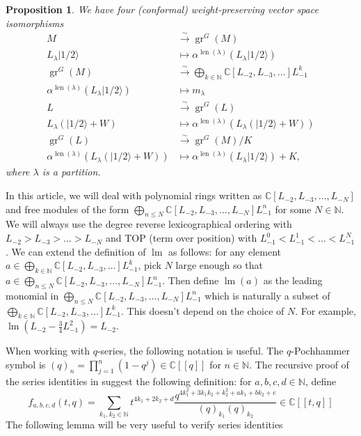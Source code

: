 \documentclass[12pt, a4paper]{article}
\newtheorem{proposition}[theorem]{Proposition}
\theoremstyle{remark}
\DeclareMathOperator{\gr}{gr}
\DeclareMathOperator{\lm}{lm}
\DeclareMathOperator{\len}{len}
\newcommand{\vachalf}{|1/2\rangle}
\begin{document}
\begin{proposition}
  \label{prp:8}
  We have four (conformal) weight-preserving vector space isomorphisms
  \begin{align*}
    M &\xrightarrow{\sim} \gr^G(M) \\
    L_\lambda\vachalf &\mapsto \alpha^{\len(\lambda)}(L_\lambda\vachalf) \\
    \gr^G(M) &\xrightarrow{\sim} \bigoplus_{k \in \mathbb{N}}\mathbb{C}[L_{-2}, L_{-3}, \dots]L_{-1}^k \\
    \alpha^{\len(\lambda)}(L_\lambda\vachalf) &\mapsto m_\lambda \\
    L &\xrightarrow{\sim} \gr^G(L) \\
    L_\lambda(\vachalf + W) &\mapsto \alpha^{\len(\lambda)}(L_\lambda(\vachalf + W)) \\
    \gr^G(L) &\xrightarrow{\sim} \gr^G(M)/K \\
    \alpha^{\len(\lambda)}(L_\lambda(\vachalf + W)) &\mapsto \alpha^{\len(\lambda)}(L_\lambda\vachalf) + K,
  \end{align*}
  where $\lambda$ is a partition.
\end{proposition}

In this article, we will deal with polynomial rings written as $\mathbb{C}[L_{-2}, L_{-3}, \dots, L_{-N}]$ and free modules of the form $\bigoplus_{n \le N}\mathbb{C}[L_{-2}, L_{-3}, \dots, L_{-N}]L_{-1}^n$ for some $N \in \mathbb{N}$.
We will always use the degree reverse lexicographical ordering with $L_{-2} > L_{-3} > \dots > L_{-N}$ and TOP (term over position) with $L_{-1}^0 < L_{-1}^1 < \dots < L_{-1}^N$.
We can extend the definition of $\lm$ as follows: for any element $a \in \bigoplus_{k \in \mathbb{N}}\mathbb{C}[L_{-2}, L_{-3}, \dots]L_{-1}^k$, pick $N$ large enough so that $a \in \bigoplus_{n \le N}\mathbb{C}[L_{-2}, L_{-3}, \dots, L_{-N}]L_{-1}^n$.
Then define $\lm(a)$ as the leading monomial in $\bigoplus_{n \le N}\mathbb{C}[L_{-2}, L_{-3}, \dots, L_{-N}]L_{-1}^n$ which is naturally a subset of $\bigoplus_{k \in \mathbb{N}}\mathbb{C}[L_{-2}, L_{-3}, \dots]L_{-1}^k$.
This doesn't depend on the choice of $N$.
For example, $\lm(L_{-2} - \frac{3}{4}L_{-1}^2) = L_{-2}$.

When working with $q$-series, the following notation is useful.
The $q$-Pochhammer symbol is $(q)_n = \prod_{j = 1}^n(1 - q^j) \in \mathbb{C}[[q]]$ for $n \in \mathbb{N}$.
The recursive proof of the series identities in \cite{andrews_singular_2022} suggest the following definition: for $a, b, c, d \in \mathbb{N}$, define
\begin{equation*}
  f_{a, b, c, d}(t, q) = \sum_{k_1, k_2 \in \mathbb{N}}t^{4k_1 + 2k_2 + d}\frac{q^{4k_1^2 + 3k_1k_2 + k_2^2 + ak_1 + bk_2 + c}}{(q)_{k_1}(q)_{k_2}} \in \mathbb{C}[[t, q]]
\end{equation*}
The following lemma will be very useful to verify series identities
\end{document}
